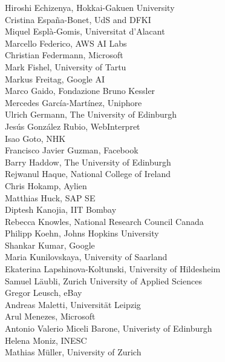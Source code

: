 \documentclass[a4paper,11pt,twoside]{book}
\begin{document}
\noindent Hiroshi Echizenya, Hokkai-Gakuen University\\
\noindent Cristina España-Bonet, UdS and DFKI\\
\noindent Miquel Esplà-Gomis, Universitat d'Alacant\\
\noindent Marcello Federico, AWS AI Labs\\
\noindent Christian Federmann, Microsoft\\
\noindent Mark Fishel, University of Tartu\\
\noindent Markus Freitag, Google AI\\
\noindent Marco Gaido, Fondazione Bruno Kessler\\
\noindent Mercedes García-Martínez, Uniphore\\
\noindent Ulrich Germann, The University of Edinburgh\\
\noindent Jesús González Rubio, WebInterpret\\
\noindent Isao Goto, NHK\\
\noindent Francisco Javier Guzman, Facebook\\
\noindent Barry Haddow, The University of Edinburgh\\
\noindent Rejwanul Haque, National College of Ireland\\
\noindent Chris Hokamp, Aylien\\
\noindent Matthias Huck, SAP SE\\
\noindent Diptesh Kanojia, IIT Bombay\\
\noindent Rebecca Knowles, National Research Council Canada\\
\noindent Philipp Koehn, Johns Hopkins University\\
\noindent Shankar Kumar, Google\\
\noindent Maria Kunilovskaya, University of Saarland\\
\noindent Ekaterina Lapshinova-Koltunski, University of Hildesheim\\
\noindent Samuel Läubli, Zurich University of Applied Sciences\\
\noindent Gregor Leusch, eBay\\
\noindent Andreas Maletti, Universität Leipzig\\
\noindent Arul Menezes, Microsoft\\
\noindent Antonio Valerio Miceli Barone, Univeristy of Edinburgh\\
\noindent Helena Moniz, INESC\\
\noindent Mathias Müller, University of Zurich\\
\end{document}
